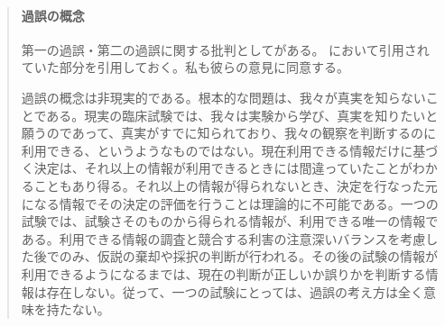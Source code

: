 \documentclass[a4paper,11pt,dvipdfmx]{jsarticle}
\begin{document}
\begin{mybox}
    \begin{quote}
    \paragraph{過誤の概念}
    第一の過誤・第二の過誤に関する批判として\cite{norleans2004臨床試験のための統計的方法}がある。
    \cite{2010毒性試験に用いる統計解析法の動向}において引用されていた部分を引用しておく。私も彼らの意見に同意する。


    過誤の概念は非現実的である。根本的な問題は、我々が真実を知らないことである。現実の臨床試験では、我々は実験から学び、真実を知りたいと願うのであって、真実がすでに知られており、我々の観察を判断するのに利用できる、というようなものではない。現在利用できる情報だけに基づく決定は、それ以上の情報が利用できるときには間違っていたことがわかることもあり得る。それ以上の情報が得られないとき、決定を行なった元になる情報でその決定の評価を行うことは理論的に不可能である。一つの試験では、試験さそのものから得られる情報が、利用できる唯一の情報である。利用できる情報の調査と競合する利害の注意深いバランスを考慮した後でのみ、仮説の棄却や採択の判断が行われる。その後の試験の情報が利用できるようになるまでは、現在の判断が正しいか誤りかを判断する情報は存在しない。従って、一つの試験にとっては、過誤の考え方は全く意味を持たない。
    \end{quote}
\end{mybox}
\end{document}
